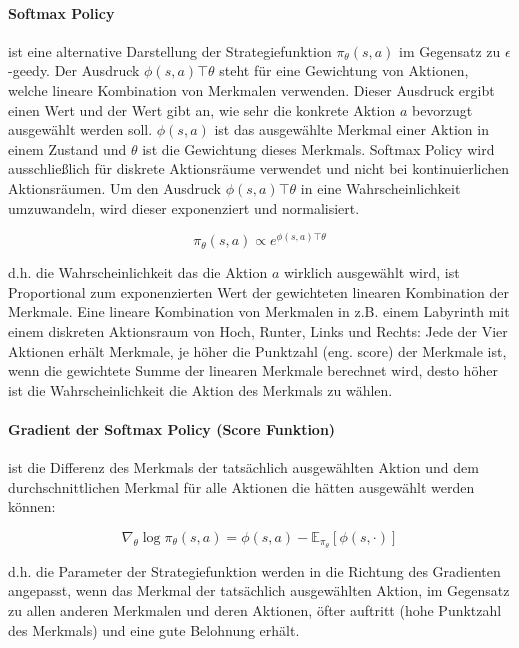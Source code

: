 \documentclass[conference]{IEEEtran}
\begin{document}
\paragraph*{Softmax Policy} ist eine alternative Darstellung der Strategiefunktion $\pi_\theta(s,a)$ im Gegensatz zu $\epsilon$-geedy. Der Ausdruck $\phi(s,a) \top \theta$ steht für eine Gewichtung von Aktionen, welche lineare Kombination von Merkmalen verwenden. Dieser Ausdruck ergibt einen Wert und der Wert gibt an, wie sehr die konkrete Aktion $a$ bevorzugt ausgewählt werden soll.  $\phi(s,a)$ ist das ausgewählte Merkmal einer Aktion in einem Zustand und $\theta$ ist die Gewichtung dieses Merkmals. Softmax Policy wird ausschließlich für diskrete Aktionsräume verwendet und nicht bei kontinuierlichen Aktionsräumen. Um den Ausdruck $\phi(s,a) \top \theta$ in eine Wahrscheinlichkeit umzuwandeln, wird dieser exponenziert und normalisiert.

\begin{equation*}
\pi_\theta(s,a) \propto e^{\phi(s,a) \top \theta}
\end{equation*}

d.h. die Wahrscheinlichkeit das die Aktion $a$ wirklich ausgewählt wird, ist Proportional zum exponenzierten Wert der gewichteten linearen Kombination der Merkmale. Eine lineare Kombination von Merkmalen in z.B. einem Labyrinth mit einem diskreten Aktionsraum von Hoch, Runter, Links und Rechts: Jede der Vier Aktionen erhält Merkmale, je höher die Punktzahl (eng. score) der Merkmale ist, wenn die gewichtete Summe der linearen Merkmale berechnet wird, desto höher ist die Wahrscheinlichkeit die Aktion des Merkmals zu wählen.

\paragraph*{Gradient der Softmax Policy (Score Funktion)} ist die Differenz des Merkmals der tatsächlich ausgewählten Aktion und dem durchschnittlichen Merkmal für alle Aktionen die hätten ausgewählt werden können: 

\begin{equation*}
\nabla_\theta \log \pi_\theta (s,a) = \phi(s,a) - \mathbb{E}_{\pi_\theta}[\phi(s, \cdot)]
\end{equation*}

d.h. die Parameter der Strategiefunktion werden in die Richtung des Gradienten angepasst, wenn das Merkmal der tatsächlich ausgewählten Aktion, im Gegensatz zu allen anderen Merkmalen und deren Aktionen, öfter auftritt (hohe Punktzahl des Merkmals) und eine gute Belohnung erhält.
\end{document}
